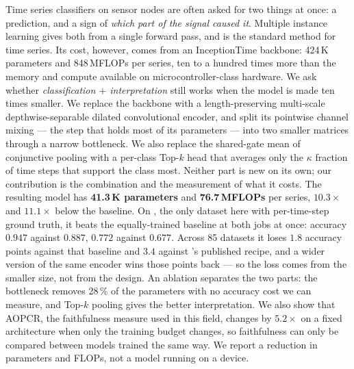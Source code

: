 
Time series classifiers on sensor nodes are often asked for two things at once: a prediction, and a
sign of \emph{which part of the signal caused it}. Multiple instance learning gives both from a
single forward pass, and \millet{} \citep{early2024millet} is the standard method for time series.
Its cost, however, comes from an InceptionTime backbone: 424\,K parameters and 848\,MFLOPs per
series, ten to a hundred times more than the memory and compute available on microcontroller-class
hardware. We ask whether \emph{classification $+$ interpretation} still works when the model is made
ten times smaller. We replace the backbone with a length-preserving multi-scale depthwise-separable
dilated convolutional encoder, and split its pointwise channel mixing --- the step that holds most
of its parameters --- into two smaller matrices through a narrow bottleneck. We also replace the
shared-gate mean of conjunctive pooling with a per-class \mbox{Top-$k$} head that averages only the
$\kappa$ fraction of time steps that support the class most. Neither part is new on its own; our
contribution is the combination and the measurement of what it costs. The resulting model has
\textbf{41.3\,K parameters} and \textbf{76.7\,MFLOPs} per series, $10.3\times$ and $11.1\times$ below
the baseline. On \webtraffic{}, the only dataset here with per-time-step ground truth, it beats the
equally-trained baseline at both jobs at once: accuracy $0.947$ against $0.887$, \ndcg{} $0.772$
against $0.677$. Across 85 \ucr{} datasets it loses $1.8$ accuracy points against that baseline and
$3.4$ against \millet{}'s published recipe, and a wider version of the same encoder wins those points
back --- so the loss comes from the smaller size, not from the design. An ablation separates the two
parts: the bottleneck removes 28\,\% of the parameters with no accuracy cost we can measure, and
\mbox{Top-$k$} pooling gives the better interpretation. We also show that AOPCR, the faithfulness
measure used in this field, changes by $5.2\times$ on a fixed architecture when only the training
budget changes, so faithfulness can only be compared between models trained the same way. We report a
reduction in parameters and FLOPs, not a model running on a device.
